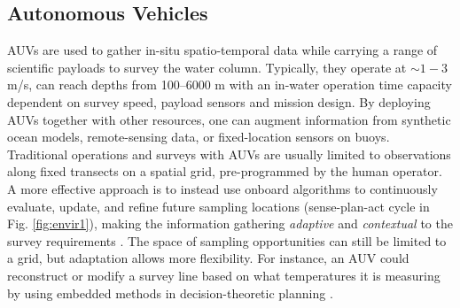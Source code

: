 \documentclass[aoas]{imsart}
\begin{document}
\subsection{Autonomous Vehicles}

AUVs are used to gather in-situ spatio-temporal data while carrying a
range of scientific payloads to survey the water column. Typically,
they operate at $\sim 1-3$ m/s, can reach depths from 100--6000 m with
an in-water operation time capacity dependent on survey speed, payload
sensors and mission design. By deploying AUVs together with other
resources, one can augment information from synthetic ocean models,
remote-sensing data, or fixed-location sensors on buoys. Traditional
operations and surveys with AUVs are usually limited to observations
along fixed transects on a spatial grid, pre-programmed by the human
operator. A more effective approach is to instead use onboard algorithms to continuously evaluate,
update, and refine future sampling locations (sense-plan-act cycle in Fig. \ref{fig:envir1}), making the information
gathering \emph{adaptive} and \emph{contextual} to the survey
requirements \citep{das11b,fossum18b,fossuminformation}. The space of
sampling opportunities can still be limited to a grid, but adaptation
allows more flexibility. For instance, an AUV could reconstruct or
modify a survey line based on what temperatures it is measuring by
using embedded methods in decision-theoretic planning
\citep{py10,Rajan12,Rajan12b}.


\end{document}
